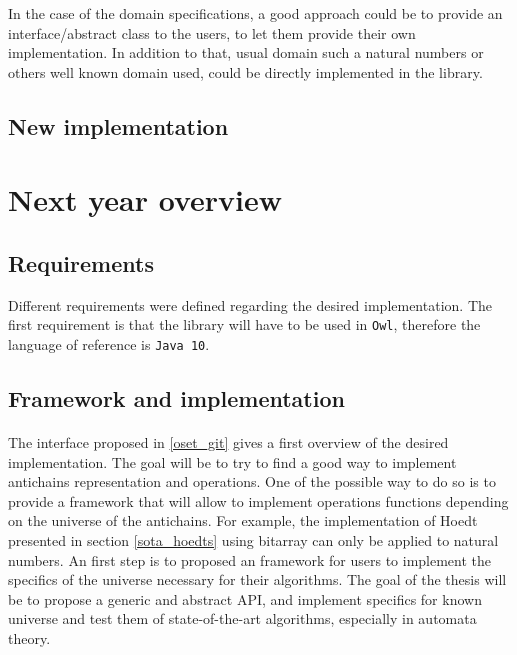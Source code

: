 \documentclass[letterpaper]{article}
\theoremstyle{definition}
\begin{document}
In the case of the domain specifications, a good approach could be to
provide an interface/abstract class to the users, to let them provide
their own implementation. In addition to that, usual domain such a
natural numbers or others well known domain used, could be directly
implemented
in the library.


\subsection{New implementation}


\section{Next year overview}

\label{conclusion}

\subsection{Requirements}

Different requirements were defined regarding the desired implementation.
The first requirement is that the library will have to be used in
\texttt{Owl}, therefore the language of reference is \texttt{Java 10}.


\subsection{Framework and implementation}

\paragraph{}

The interface proposed in \ref{oset_git} gives a first overview
of the desired implementation. The goal will be to try to find a good
way to implement antichains representation
and operations. One of the possible way to do so is to provide
a framework that will allow to implement
operations functions
depending on the universe of the antichains. For example,
the implementation of Hoedt presented in section \ref{sota_hoedts}
using bitarray can only be applied to natural numbers. An first step
is to proposed an framework for users to implement the specifics of the
universe necessary for their algorithms. The goal of the thesis will
be to propose a generic and abstract API, and implement specifics
for known universe and test them of state-of-the-art algorithms,
especially in automata theory.
\end{document}
